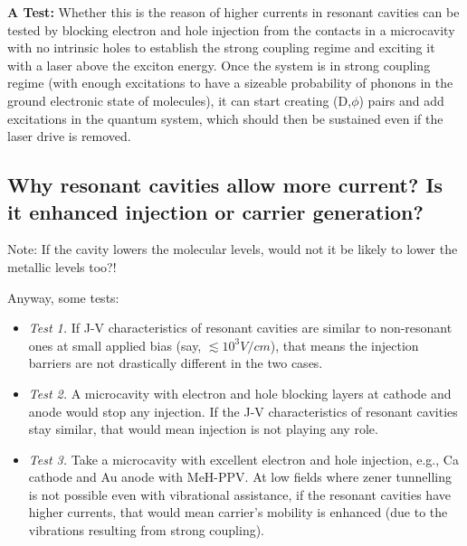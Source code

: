 \documentclass[a4paper,twocolumn]{revtex4-1} %
\begin{document}
{\bf A Test: }
Whether this is the reason of higher currents in resonant cavities 
can be tested by blocking electron and hole injection from the 
contacts in a microcavity with no intrinsic holes to establish the 
strong coupling regime and exciting it with a laser above the exciton energy. 
Once the system is in strong coupling regime 
(with enough excitations to have a sizeable probability 
of phonons in the ground electronic state of molecules),
it can start creating (D,$\phi$) pairs and add excitations in the 
quantum system, which should then be sustained even if the laser 
drive is removed.


\subsection{Why resonant cavities allow more current? Is it enhanced injection or carrier generation?}

Note: If the cavity lowers the molecular levels, would not it be likely to lower the metallic levels too?!

Anyway, some tests:
\begin{itemize}
 
 \item {\it Test 1. }
If J-V characteristics of resonant cavities are similar
 to non-resonant ones at small applied bias (say, $\lesssim10^{3}V/cm$),
that means the injection barriers are not drastically different
in the two cases.
 
 \item {\it Test 2. }
A microcavity with electron and hole blocking layers at cathode and anode would stop any injection.
If the J-V characteristics of resonant cavities stay similar,
that would mean injection is not playing any role.

 \item {\it Test 3. }
Take a microcavity with excellent electron and hole injection, e.g., Ca cathode and Au anode with MeH-PPV.
At low fields where zener tunnelling is not possible even with vibrational assistance,
if the resonant cavities have higher currents,
that would mean carrier's mobility is enhanced (due to the vibrations resulting from strong coupling).

\end{itemize}
\end{document}
